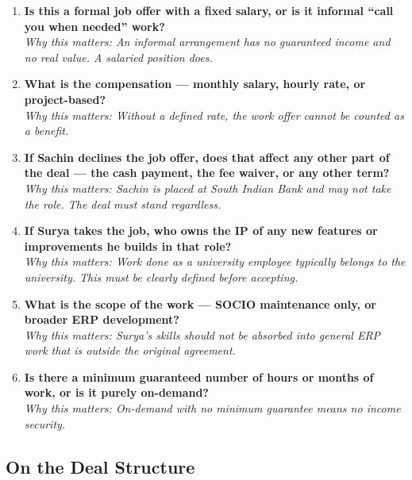 \documentclass[12pt,a4paper]{article}
\begin{document}
\begin{enumerate}[leftmargin=*, label=\textbf{Q\arabic*.}, resume]

    \item \textbf{Is this a formal job offer with a fixed salary, or is it informal ``call you when needed'' work?}\\
    \textit{Why this matters: An informal arrangement has no guaranteed income and no real value. A salaried position does.}

    \item \textbf{What is the compensation — monthly salary, hourly rate, or project-based?}\\
    \textit{Why this matters: Without a defined rate, the work offer cannot be counted as a benefit.}

    \item \textbf{If Sachin declines the job offer, does that affect any other part of the deal — the cash payment, the fee waiver, or any other term?}\\
    \textit{Why this matters: Sachin is placed at South Indian Bank and may not take the role. The deal must stand regardless.}

    \item \textbf{If Surya takes the job, who owns the IP of any new features or improvements he builds in that role?}\\
    \textit{Why this matters: Work done as a university employee typically belongs to the university. This must be clearly defined before accepting.}

    \item \textbf{What is the scope of the work — SOCIO maintenance only, or broader ERP development?}\\
    \textit{Why this matters: Surya's skills should not be absorbed into general ERP work that is outside the original agreement.}

    \item \textbf{Is there a minimum guaranteed number of hours or months of work, or is it purely on-demand?}\\
    \textit{Why this matters: On-demand with no minimum guarantee means no income security.}

\end{enumerate}

\subsection{On the Deal Structure}
\end{document}
